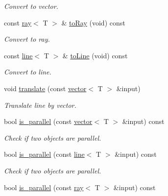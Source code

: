 \begin{DoxyCompactItemize}
\begin{DoxyCompactList}\small\item\em Convert to vector. \end{DoxyCompactList}\item 
\mbox{\label{classddd_1_1segment_a7d1f499833d4836df22ae38e0a08972e}} 
const \hyperlink{classddd_1_1ray}{ray}$<$ T $>$ \& \hyperlink{classddd_1_1segment_a7d1f499833d4836df22ae38e0a08972e}{to\+Ray} (void) const
\begin{DoxyCompactList}\small\item\em Convert to ray. \end{DoxyCompactList}\item 
\mbox{\label{classddd_1_1segment_aeac2e89c66a714d596695c17b4219491}} 
const \hyperlink{classddd_1_1line}{line}$<$ T $>$ \& \hyperlink{classddd_1_1segment_aeac2e89c66a714d596695c17b4219491}{to\+Line} (void) const
\begin{DoxyCompactList}\small\item\em Convert to line. \end{DoxyCompactList}\item 
void \hyperlink{classddd_1_1segment_a6d8ad6c6abeea8de7ff679a8f55033ff}{translate} (const \hyperlink{classddd_1_1vector}{vector}$<$ T $>$ \&input)
\begin{DoxyCompactList}\small\item\em Translate line by vector. \end{DoxyCompactList}\item 
bool \hyperlink{classddd_1_1segment_a84c437b0f7838bc439e11cc1687c12ff}{is\+\_\+parallel} (const \hyperlink{classddd_1_1vector}{vector}$<$ T $>$ \&input) const
\begin{DoxyCompactList}\small\item\em Check if two objects are parallel. \end{DoxyCompactList}\item 
bool \hyperlink{classddd_1_1segment_af63ef3a1f60cb14a96e9dbcf6fecaf66}{is\+\_\+parallel} (const \hyperlink{classddd_1_1line}{line}$<$ T $>$ \&input) const
\begin{DoxyCompactList}\small\item\em Check if two objects are parallel. \end{DoxyCompactList}\item 
bool \hyperlink{classddd_1_1segment_a52f0c892e033d93df537635ebcfd0c60}{is\+\_\+parallel} (const \hyperlink{classddd_1_1ray}{ray}$<$ T $>$ \&input) const

\end{DoxyCompactItemize}
